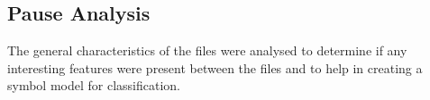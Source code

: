 
\subsection{Pause Analysis}
The general characteristics of the files were analysed to determine if any interesting features were present between the files and to help in creating a symbol model for classification.
%
%



